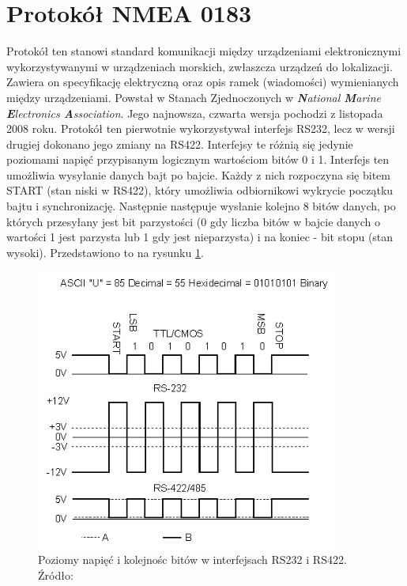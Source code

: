 \section{Protokół NMEA 0183}
\label{NMEA}

Protokół ten stanowi standard komunikacji między urządzeniami elektronicznymi wykorzystywanymi w urządzeniach morskich, zwłaszcza urządzeń do lokalizacji. Zawiera on specyfikację elektryczną oraz opis ramek (wiadomości) wymienianych między urządzeniami. Powstał w Stanach Zjednoczonych w \textit{\textbf{N}ational \textbf{M}arine \textbf{E}lectronics \textbf{A}ssociation}. Jego najnowsza, czwarta wersja pochodzi z listopada 2008 roku. 
Protokół ten pierwotnie wykorzystywał interfejs RS232, lecz w wersji drugiej dokonano jego zmiany na RS422. Interfejsy te różnią się jedynie poziomami napięć przypisanym logicznym wartościom bitów 0 i 1. 
Interfejs ten umożliwia wysyłanie danych bajt po bajcie. Każdy z nich rozpoczyna się bitem START (stan niski w RS422), który umożliwia odbiornikowi wykrycie początku bajtu i synchronizację. Następnie następuje wysłanie kolejno 8 bitów danych, po których przesyłany jest bit parzystości (0 gdy liczba bitów w bajcie danych o wartości 1 jest parzysta lub 1 gdy jest nieparzysta) i na koniec - bit stopu (stan wysoki). Przedstawiono to na rysunku \ref{fig:image_nmea_rs422}.

\begin{figure}[H]
	\centering
	\includegraphics[width=10cm]{img/theory/NMEA/RS232_RS422.png}
	\caption{Poziomy napięć i kolejnośc bitów w interfejsach RS232 i RS422. Źródło: \cite{RS422}}
	\label{fig:image_nmea_rs422}
\end{figure}


